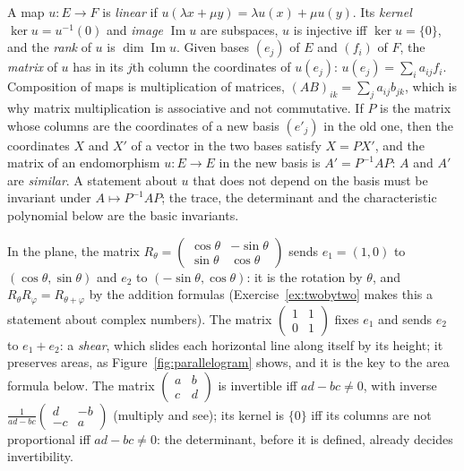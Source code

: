 \begin{reminder}
A map $u:E\to F$ is \emph{linear} if $u(\lambda x+\mu y)=\lambda u(x)+\mu u(y)$. Its \emph{kernel} $\ker u=u^{-1}(0)$ and \emph{image} $\operatorname{Im}u$ are subspaces, $u$ is injective iff $\ker u=\{0\}$, and the \emph{rank} of $u$ is $\dim\operatorname{Im}u$. Given bases $(e_j)$ of $E$ and $(f_i)$ of $F$, the \emph{matrix} of $u$ has in its $j$th column the coordinates of $u(e_j)$: $u(e_j)=\sum_ia_{ij}f_i$. Composition of maps is multiplication of matrices, $(AB)_{ik}=\sum_ja_{ij}b_{jk}$, which is why matrix multiplication is associative and not commutative. If $P$ is the matrix whose columns are the coordinates of a new basis $(e'_j)$ in the old one, then the coordinates $X$ and $X'$ of a vector in the two bases satisfy $X=PX'$, and the matrix of an endomorphism $u:E\to E$ in the new basis is $A'=P^{-1}AP$: $A$ and $A'$ are \emph{similar}. A statement about $u$ that does not depend on the basis must be invariant under $A\mapsto P^{-1}AP$; the trace, the determinant and the characteristic polynomial below are the basic invariants.
\end{reminder}

\begin{examplex}
In the plane, the matrix $R_\theta=\begin{pmatrix}\cos\theta&-\sin\theta\\ \sin\theta&\cos\theta\end{pmatrix}$ sends $e_1=(1,0)$ to $(\cos\theta,\sin\theta)$ and $e_2$ to $(-\sin\theta,\cos\theta)$: it is the rotation by $\theta$, and $R_\theta R_\varphi=R_{\theta+\varphi}$ by the addition formulas (Exercise~\ref{ex:twobytwo} makes this a statement about complex numbers). The matrix $\begin{pmatrix}1&1\\0&1\end{pmatrix}$ fixes $e_1$ and sends $e_2$ to $e_1+e_2$: a \emph{shear}, which slides each horizontal line along itself by its height; it preserves areas, as Figure~\ref{fig:parallelogram} shows, and it is the key to the area formula below. The matrix $\begin{pmatrix}a&b\\c&d\end{pmatrix}$ is invertible iff $ad-bc\ne0$, with inverse $\frac1{ad-bc}\begin{pmatrix}d&-b\\-c&a\end{pmatrix}$ (multiply and see); its kernel is $\{0\}$ iff its columns are not proportional iff $ad-bc\ne0$: the determinant, before it is defined, already decides invertibility.
\end{examplex}

